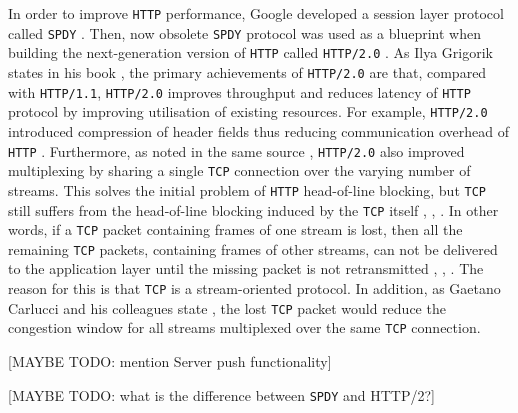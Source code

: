 \documentclass[12pt,a4paper,twoside,openright]{report}
\begin{document}
In order to improve \texttt{HTTP} performance, Google developed a session layer protocol called \texttt{SPDY} \cite{bib_SPDY_white_paper}.
Then, now obsolete \texttt{SPDY} protocol was used as a blueprint when building the next-generation version of \texttt{HTTP} called \texttt{HTTP/2.0} \cite{bib_SPDY_vs_HTTP2}.
As Ilya Grigorik states in his book \cite[Chapter~12]{bib_grigorik2013}, the primary achievements of \texttt{HTTP/2.0} are that, compared with \texttt{HTTP/1.1}, \texttt{HTTP/2.0} improves throughput and reduces latency of \texttt{HTTP} protocol by improving utilisation of existing resources.
For example, \texttt{HTTP/2.0} introduced compression of header fields thus reducing communication overhead of \texttt{HTTP} \cite[Chapter~12]{bib_grigorik2013}.
Furthermore, as noted in the same source \cite[Chapter~12]{bib_grigorik2013}, 
\texttt{HTTP/2.0} also improved multiplexing by sharing a single \texttt{TCP} connection over the varying number of streams.
This solves the initial problem of \texttt{HTTP} head-of-line blocking, but \texttt{TCP} still suffers from the head-of-line blocking induced by the \texttt{TCP} itself \cite{bib_making_web_faster_with_http2}, \cite{bib_TCP_Head_of_line_blocking_stackoverflow},
\cite{How-does-HTTP-2-solve-the-Head-of-Line-blocking-HOL-issue}.
In other words, if a \texttt{TCP} packet containing frames of one stream is lost, then all the remaining \texttt{TCP} packets, containing frames of other streams, can not be delivered to the application layer until the missing packet is not retransmitted \cite{bib_making_web_faster_with_http2}, \cite{bib_TCP_Head_of_line_blocking_stackoverflow}, 
\cite{How-does-HTTP-2-solve-the-Head-of-Line-blocking-HOL-issue}.
The reason for this is that \texttt{TCP} is a stream-oriented protocol.
In addition, as Gaetano Carlucci and his colleagues state \cite{HTTP_over_UDP_An_Experimental_Investigation_of_QUIC}, the lost \texttt{TCP} packet would reduce the congestion window for all streams multiplexed over the same \texttt{TCP} connection.



[MAYBE TODO: mention Server push functionality]

[MAYBE TODO: what is the difference between \texttt{SPDY} and HTTP/2?]
\end{document}
